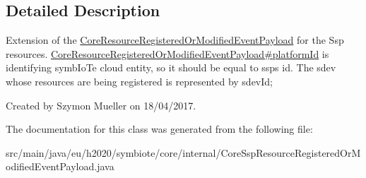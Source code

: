 \subsection{Detailed Description}
Extension of the \hyperlink{classeu_1_1h2020_1_1symbiote_1_1core_1_1internal_1_1CoreResourceRegisteredOrModifiedEventPayload}{Core\+Resource\+Registered\+Or\+Modified\+Event\+Payload} for the Ssp resources. \hyperlink{}{Core\+Resource\+Registered\+Or\+Modified\+Event\+Payload\#platform\+Id} is identifying symb\+Io\+Te cloud entity, so it should be equal to ssp\textquotesingle{}s id. The sdev whose resources are being registered is represented by sdev\+Id;

Created by Szymon Mueller on 18/04/2017. 

The documentation for this class was generated from the following file\+:\begin{DoxyCompactItemize}
\item 
src/main/java/eu/h2020/symbiote/core/internal/Core\+Ssp\+Resource\+Registered\+Or\+Modified\+Event\+Payload.\+java\end{DoxyCompactItemize}
